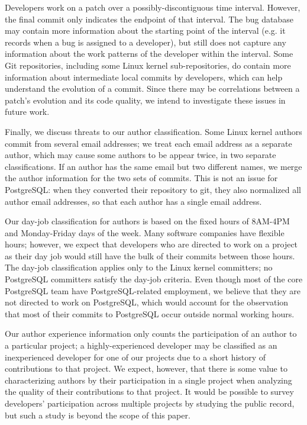 Developers work on a patch over a possibly-discontiguous time
interval. However, the final commit only indicates the endpoint of
that interval.  The bug database may contain more information about
the starting point of the interval (e.g. it records when a bug is
assigned to a developer), but still does not capture any information
about the work patterns of the developer within the interval. Some Git
repositories, including some Linux kernel sub-repositories, do contain more
information about intermediate local commits by developers, which can
help understand the evolution of a commit. Since there may be
correlations between a patch's evolution and its code quality, we
intend to investigate these issues in future work.

Finally, we discuss threats to our author classification. Some Linux kernel 
authors commit from several email addresses; we treat each
email address as a separate author, which may cause some authors to be
appear twice, in two separate classifications. If an author has the
same email but two different names, we merge the author information
for the two sets of commits. This is not an issue for PostgreSQL: when
they converted their repository to git, they also normalized all author
email addresses, so that each author has a single email address.

Our day-job classification for authors is based on the fixed hours of
8AM-4PM and Monday-Friday days of the week.  Many software companies
have flexible hours; however, we expect that developers who are
directed to work on a project as their day job would still have the
bulk of their commits between those hours.  The day-job classification
applies only to the Linux kernel committers; no PostgreSQL committers satisfy
the day-job criteria. Even though most of the core PostgreSQL team have
PostgreSQL-related employment, we believe that they are not directed to
work on PostgreSQL, which would account for the observation that most of
their commits to PostgreSQL occur outside normal working hours.

Our author experience information only counts the participation of an
author to a particular project; a highly-experienced developer may be
classified as an inexperienced developer for one of our projects due
to a short history of contributions to that project. We expect,
however, that there is some value to characterizing authors by their
participation in a single project when analyzing the quality of their
contributions to that project. It would be possible to survey
developers' participation across multiple projects by studying the
public record, but such a study is beyond the scope of this paper.
